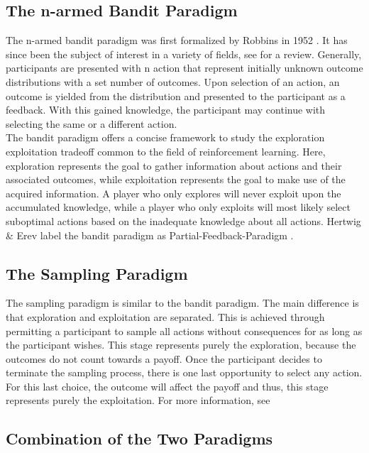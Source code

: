 \documentclass[
	12pt,
	oneside,
	bibliography=totocnumbered]{scrartcl}
\begin{document}
\subsection{The n-armed Bandit Paradigm}

The n-armed bandit paradigm was first formalized by Robbins in 1952 \cite{robbins1952}. It has since been the subject of interest in a variety of fields, see \cite{berry1985} for a review. Generally, participants are presented with n action that represent initially unknown outcome distributions with a set number of outcomes. Upon selection of an action, an outcome is yielded from the distribution and presented to the participant as a feedback. With this gained knowledge, the participant may continue with selecting the same or a different action. \\

The bandit paradigm offers a concise framework to study the exploration exploitation tradeoff common to the field of reinforcement learning. Here, exploration represents the goal to gather information about actions and their associated outcomes, while exploitation represents the goal to make use of the acquired information. A player who only explores will never exploit upon the accumulated knowledge, while a player who only exploits will most likely select suboptimal actions based on the inadequate knowledge about all actions. Hertwig \& Erev label the bandit paradigm as Partial-Feedback-Paradigm \cite{hertwig2009}.



\subsection{The Sampling Paradigm}

The sampling paradigm is similar to the bandit paradigm. The main difference is that exploration and exploitation are separated. This is achieved through permitting a participant to sample all actions without consequences for as long as the participant wishes. This stage represents purely the exploration, because the outcomes do not count towards a payoff. Once the participant decides to terminate the sampling process, there is one last opportunity to select any action. For this last choice, the outcome will affect the payoff and thus, this stage represents purely the exploitation. For more information, see \cite{hertwig2011, erev2014, hertwig2009}




\subsection{Combination of the Two Paradigms}
\end{document}
